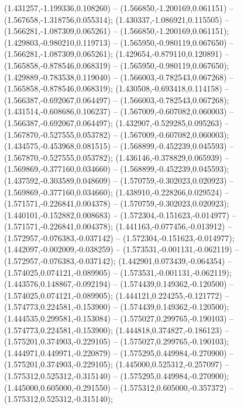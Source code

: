  (1.431257,-1.199336,0.108260) -- (1.566850,-1.200169,0.061151) -- (1.567658,-1.318756,0.055314);
 (1.430337,-1.086921,0.115505) -- (1.566281,-1.087309,0.065261) -- (1.566850,-1.200169,0.061151);
 (1.429803,-0.980210,0.119713) -- (1.565950,-0.980119,0.067650) -- (1.566281,-1.087309,0.065261);
 (1.429654,-0.879110,0.120891) -- (1.565858,-0.878546,0.068319) -- (1.565950,-0.980119,0.067650);
 (1.429889,-0.783538,0.119040) -- (1.566003,-0.782543,0.067268) -- (1.565858,-0.878546,0.068319);
 (1.430508,-0.693418,0.114158) -- (1.566387,-0.692067,0.064497) -- (1.566003,-0.782543,0.067268);
 (1.431514,-0.608686,0.106237) -- (1.567009,-0.607082,0.060003) -- (1.566387,-0.692067,0.064497);
 (1.432907,-0.529285,0.095263) -- (1.567870,-0.527555,0.053782) -- (1.567009,-0.607082,0.060003);
 (1.434575,-0.453968,0.081515) -- (1.568899,-0.452239,0.045593) -- (1.567870,-0.527555,0.053782);
 (1.436146,-0.378829,0.065939) -- (1.569869,-0.377160,0.034660) -- (1.568899,-0.452239,0.045593);
 (1.437592,-0.303589,0.048609) -- (1.570759,-0.302023,0.020923) -- (1.569869,-0.377160,0.034660);
 (1.438910,-0.228266,0.029524) -- (1.571571,-0.226841,0.004378) -- (1.570759,-0.302023,0.020923);
 (1.440101,-0.152882,0.008683) -- (1.572304,-0.151623,-0.014977) -- (1.571571,-0.226841,0.004378);
 (1.441163,-0.077456,-0.013912) -- (1.572957,-0.076383,-0.037142) -- (1.572304,-0.151623,-0.014977);
 (1.442097,-0.002009,-0.038259) -- (1.573531,-0.001131,-0.062119) -- (1.572957,-0.076383,-0.037142);
 (1.442901,0.073439,-0.064354) -- (1.574025,0.074121,-0.089905) -- (1.573531,-0.001131,-0.062119);
 (1.443576,0.148867,-0.092194) -- (1.574439,0.149362,-0.120500) -- (1.574025,0.074121,-0.089905);
 (1.444121,0.224255,-0.121772) -- (1.574773,0.224581,-0.153900) -- (1.574439,0.149362,-0.120500);
 (1.444535,0.299581,-0.153084) -- (1.575027,0.299765,-0.190103) -- (1.574773,0.224581,-0.153900);
 (1.444818,0.374827,-0.186123) -- (1.575201,0.374903,-0.229105) -- (1.575027,0.299765,-0.190103);
 (1.444971,0.449971,-0.220879) -- (1.575295,0.449984,-0.270900) -- (1.575201,0.374903,-0.229105);
 (1.445000,0.525312,-0.257097) -- (1.575312,0.525312,-0.315140) -- (1.575295,0.449984,-0.270900);
 (1.445000,0.605000,-0.291550) -- (1.575312,0.605000,-0.357372) -- (1.575312,0.525312,-0.315140);
